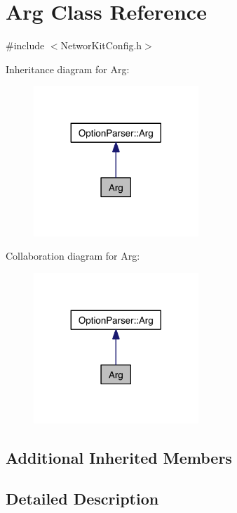 \hypertarget{class_arg}{\section{Arg Class Reference}
\label{class_arg}
}


{\ttfamily \#include $<$Networ\-Kit\-Config.\-h$>$}



Inheritance diagram for Arg\-:\nopagebreak
\begin{figure}[H]
\begin{center}
\leavevmode
\includegraphics[width=176pt]{class_arg__inherit__graph}
\end{center}
\end{figure}


Collaboration diagram for Arg\-:\nopagebreak
\begin{figure}[H]
\begin{center}
\leavevmode
\includegraphics[width=176pt]{class_arg__coll__graph}
\end{center}
\end{figure}
\subsection*{Additional Inherited Members}


\subsection{Detailed Description}


